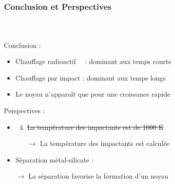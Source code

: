 \documentclass{beamer}
\begin{document}
\begin{frame}
	\frametitle{Conclusion et Perspectives}
	\framesubtitle{\ }
	
{\huge Conclusion :}
\vspace{0.3cm}

\begin{itemize}
\item Chauffage radioactif \ \ : dominant aux temps courts

\item Chauffage par impact : dominant aux temps longs

\item Le noyau n'apparaît que pour une croissance rapide
\end{itemize}
\vspace{0.7cm}

{\huge Perspectives :}
\vspace{0.3cm}

\begin{itemize}
\item 
\begin{enumerate}
\setcounter{enumi}{3}
\item \sout{La température des impactants est de 1000 K}

$\rightarrow$ La température des impactants est calculée
\end{enumerate}

\item Séparation métal-silicate :

$\rightarrow$ La séparation favorise la formation d'un noyau

\end{itemize}
	
\end{frame}
\end{document}
